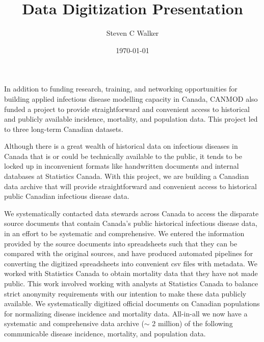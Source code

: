 \documentclass{article}
\title{Data Digitization Presentation}
\date{\today}
\author{Steven C Walker}
\begin{document}
  \maketitle
  In addition to funding research, training, and networking opportunities for building applied infectious disease modelling capacity in Canada, CANMOD also funded a project to provide straightforward and convenient access to historical and publicly available incidence, mortality, and population data. This project led to three long-term Canadian datasets.

Although there is a great wealth of historical data on infectious diseases in Canada that is or could be technically available to the public, it tends to be locked up in inconvenient formats like handwritten documents and internal databases at Statistics Canada. With this project, we are building a Canadian data archive that will provide straightforward and convenient access to historical public Canadian infectious disease data.

We systematically contacted data stewards across Canada to access the disparate source documents that contain Canada's public historical infectious disease data, in an effort to be systematic and comprehensive. We entered the information provided by the source documents into spreadsheets such that they can be compared with the original sources, and have produced automated pipelines for converting the digitized spreadsheets into convenient csv files with metadata. We worked with Statistics Canada to obtain mortality data that they have not made public. This work involved working with analysts at Statistics Canada to balance strict anonymity requirements with our intention to make these data publicly available. We systematically digitized official documents on Canadian populations for normalizing disease incidence and mortality data. All-in-all we now have a systematic and comprehensive data archive ($\sim$ 2 million) of the following communicable disease incidence, mortality, and population data.
\end{document}
